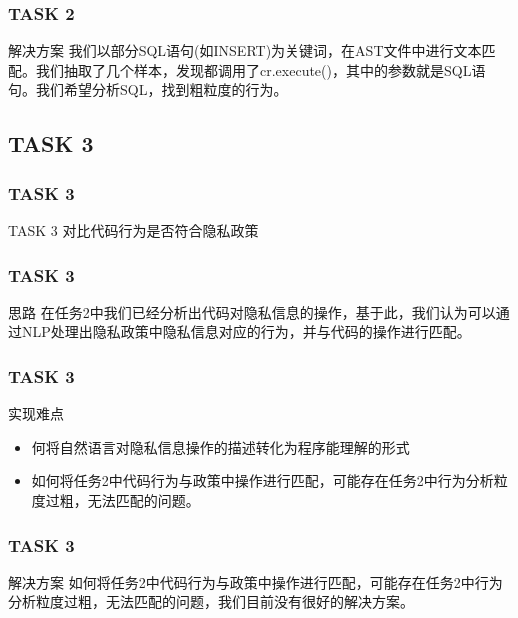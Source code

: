 \documentclass[10pt]{ctexbeamer}
\begin{document}
    \begin{frame}
        \frametitle{TASK 2}
        \begin{block}{解决方案}
            我们以部分SQL语句(如INSERT)为关键词，在AST文件中进行文本匹配。我们抽取了几个样本，发现都调用了cr.execute()，其中的参数就是SQL语句。我们希望分析SQL，找到粗粒度的行为。
        \end{block}
    \end{frame}

    \subsection{TASK 3}
    \begin{frame}
        \frametitle{TASK 3}
    
        \begin{block}{TASK 3}
            对比代码行为是否符合隐私政策
        \end{block} 
    
    \end{frame}

    \begin{frame}
        \frametitle{TASK 3}
        \begin{block}{思路}
            在任务2中我们已经分析出代码对隐私信息的操作，基于此，我们认为可以通过NLP处理出隐私政策中隐私信息对应的行为，并与代码的操作进行匹配。
        \end{block}
    \end{frame}

    \begin{frame}
        \frametitle{TASK 3}
        \begin{block}{实现难点}
            \begin{itemize}
                \item 何将自然语言对隐私信息操作的描述转化为程序能理解的形式
                \item 如何将任务2中代码行为与政策中操作进行匹配，可能存在任务2中行为分析粒度过粗，无法匹配的问题。
            \end{itemize}
        \end{block}
    \end{frame}

    \begin{frame}
        \frametitle{TASK 3}
        \begin{block}{解决方案}
            如何将任务2中代码行为与政策中操作进行匹配，可能存在任务2中行为分析粒度过粗，无法匹配的问题，我们目前没有很好的解决方案。
        \end{block}
    \end{frame}
\end{document}
